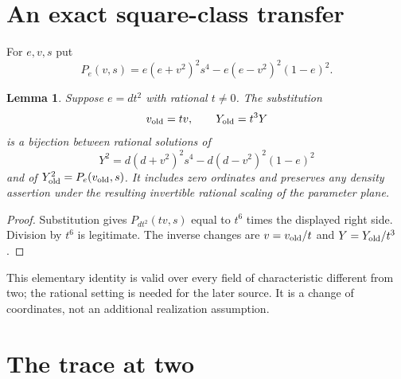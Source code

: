 \documentclass[11pt]{article}
\newtheorem{lemma}[theorem]{Lemma}
\begin{document}
\section{An exact square-class transfer}

For $e,v,s$ put
\[
 P_e(v,s)=e(e+v^2)^2s^4-e(e-v^2)^2(1-e)^2.
\]
\begin{lemma}\label{lem:transfer}
Suppose $e=dt^2$ with rational $t\ne0$. The substitution
\[
 v_{\rm old}=tv,\qquad Y_{\rm old}=t^3Y
\]
is a bijection between rational solutions of
\[
 Y^2=d(d+v^2)^2s^4-d(d-v^2)^2(1-e)^2
\]
and of $Y_{\rm old}^2=P_e(v_{\rm old},s)$.
It includes zero ordinates and preserves any density assertion under
the resulting invertible rational scaling of the parameter plane.
\end{lemma}
\begin{proof}
Substitution gives $P_{dt^2}(tv,s)$ equal to $t^6$ times the displayed
right side. Division by $t^6$ is legitimate. The inverse changes are
$v=v_{\rm old}/t$ and $Y=Y_{\rm old}/t^3$.
\end{proof}
This elementary identity is valid over every field of characteristic
different from two; the rational setting is needed for the later source.
It is a change of coordinates, not an additional realization assumption.

\section{The trace at two}
\end{document}
